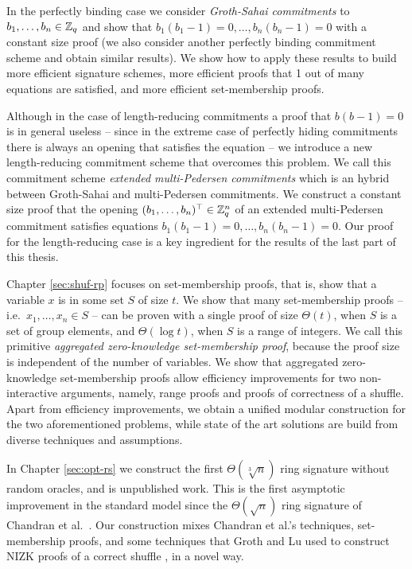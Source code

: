 In the perfectly binding case we consider \emph{Groth-Sahai commitments} to $b_1,\ldots,\allowbreak b_n\allowbreak\in\mathbb{Z}_q$ and show that $b_1(b_1-1)=0,\ldots,b_n(b_n-1)=0$ with a constant size proof (we also consider another perfectly binding commitment scheme and obtain similar results). We show how to apply these results to build more efficient signature schemes, more efficient proofs that {1 out of many} equations are satisfied, and more efficient set-membership proofs.

Although in the case of length-reducing commitments a proof that $b(b-1)=0$ is in general useless -- since in the extreme case of {perfectly hiding commitments} there is always an opening that satisfies the equation -- we introduce a new length-reducing commitment scheme that overcomes this problem. We call this commitment scheme \emph{extended multi-Pedersen commitments} which is an hybrid between Groth-Sahai and multi-Pedersen commitments. We construct a constant size proof that the opening $(b_1,\ldots,b_n)^\top\in\mathbb{Z}_q^n$ of an extended multi-Pedersen commitment satisfies equations $b_1(b_1-1)=0,\ldots,b_n(b_n-1)=0$.
Our proof for the length-reducing case is a key ingredient for the results of the last part of this thesis.
 
Chapter \ref{sec:shuf-rp} focuses on set-membership proofs, that is, show that a variable $x$ is in some set $S$ of size $t$. We show that many set-membership proofs -- i.e.~$x_1,\ldots,x_n\in S$ -- can be proven with a single proof of size $\Theta(t)$, when $S$ is a set of group elements, and $\Theta(\log t)$, when $S$ is a range of integers. We call this primitive \emph{aggregated zero-knowledge set-membership proof}, because the proof size is independent of the number of variables. We show that aggregated zero-knowledge set-membership proofs allow efficiency improvements for two non-interactive arguments, namely, range proofs and proofs of correctness of a shuffle. Apart from efficiency improvements, we obtain a unified modular construction for the two aforementioned problems, while state of the art solutions are build from diverse techniques and assumptions.

In Chapter \ref{sec:opt-rs} we construct the first $\Theta(\sqrt[3]{n})$ ring signature without random oracles, and is unpublished work.
This is the first asymptotic improvement in the standard model since the $\Theta(\sqrt{n})$ ring signature of Chandran et al.~\cite{ICALP:ChaGroSah07}.
Our construction mixes Chandran et al.'s techniques, set-membership proofs, and some techniques that Groth and Lu used to construct NIZK proofs of a correct shuffle \cite{AC:GroLu07}, in a novel way.


